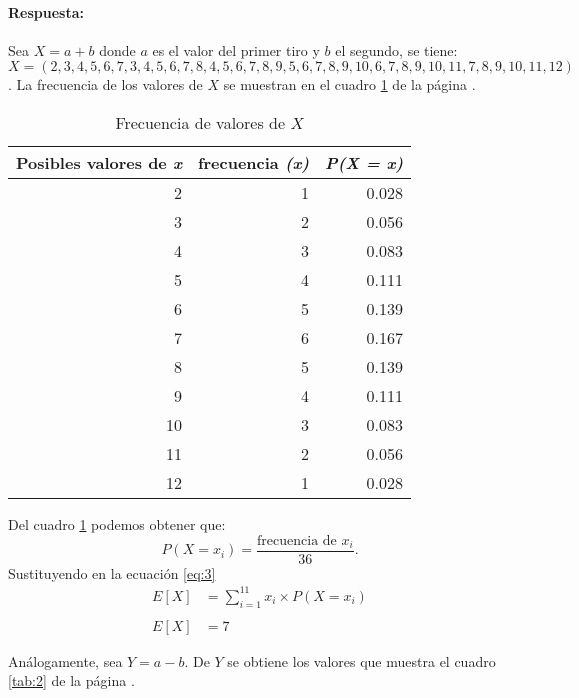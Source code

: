 \documentclass{article}
\begin{document}
\paragraph{Respuesta:} Sea $X = a + b$ donde $a$ es el valor del primer tiro y $b$ el segundo, se tiene:
$ X = (2, 3, 4, 5, 6, 7, 3, 4, 5, 6, 7, 8, 4, 5, 6, 7, 8, 9, 5, 6, 7, 8, 9, 10, 6, 7, 8, 9,10,11, 7, 8, 9, 10,11, 12)$. La frecuencia de los valores de $X$ se muestran en el cuadro \ref{tab:1} de la página \pageref{tab:1}.

\begin{table}[H]
  \centering
  \caption{Frecuencia de valores de $X$}
    \begin{tabular}{rrr}
    \toprule
    \multicolumn{1}{p{5.39em}}{\textbf{Posibles valores de \textit{\textbf{x}}}} & \multicolumn{1}{l}{\textbf{frecuencia  \textit{\textbf{(x)}}}} & \multicolumn{1}{l}{\textit{\textbf{P(X = x)}}} \\
    \midrule
    2     & 1     & 0.028 \\
    3     & 2     & 0.056 \\
    4     & 3     & 0.083 \\
    5     & 4     & 0.111 \\
    6     & 5     & 0.139 \\
    7     & 6     & 0.167 \\
    8     & 5     & 0.139 \\
    9     & 4     & 0.111 \\
    10    & 3     & 0.083 \\
    11    & 2     & 0.056 \\
    12    & 1     & 0.028 \\
    \bottomrule
    \end{tabular}%
  \label{tab:1}%
\end{table}%

Del cuadro \ref{tab:1} podemos obtener que:
\begin{equation}
 P(X = x_{i}) = \frac{\text{frecuencia de $x_{i}$} }{36}.   
\end{equation}
Sustituyendo en la ecuación \ref{eq:3}
\begin{equation}
\begin{array}{ll}
   E[X] &= \sum_{i=1}^{11} x_{i}  \times P(X=x_{i})\\
   &\\
   E[X] & = 7
  \end{array}
\end{equation}

Análogamente, sea $Y= a-b$. De $Y$ se obtiene los valores que muestra el cuadro \ref{tab:2} de la página \pageref{tab:2}.
\end{document}
